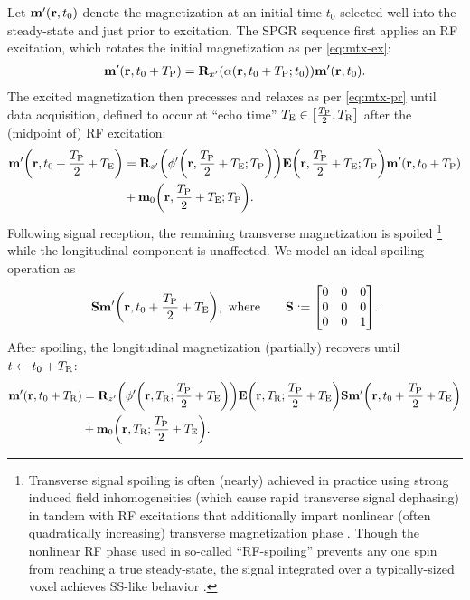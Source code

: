 Let $\bmmp\prtz$ denote the magnetization
at an initial time $t_0$ 
selected well into the steady-state
and just prior to excitation.
The SPGR sequence first applies
an RF excitation, 
which rotates the initial magnetization
as per \eqref{eq:mtx-ex}:
\begin{align}
	\bmmp\paren{\bmr,t_0+\TP} = \bmRxp{\flip\prtzt{t_0+\TP}} \bmmp\prtz.
	\label{eq:spgr-ex}
\end{align}
The excited magnetization 
then precesses and relaxes
as per \eqref{eq:mtx-pr}
until data acquisition,
defined to occur at
``echo time'' $\TE \in \brac{\frac{\TP}{2},\TR}$
after the (midpoint of) RF excitation:
\begin{align}
	\bmmp\paren{\bmr,t_0+\frac{\TP}{2}+\TE} &=
	\bmRzp{\php\paren{\bmr,\frac{\TP}{2}+\TE;\TP}} 
	\bmE\paren{\bmr,\frac{\TP}{2}+\TE;\TP} \bmmp\paren{\bmr,t_0+\TP} \nonumber \\
	&+ \bmmzero\paren{\bmr,\frac{\TP}{2}+\TE;\TP}.
	\label{eq:spgr-daq}
\end{align}
Following signal reception,
the remaining transverse magnetization 
is spoiled 
\footnote{Transverse signal spoiling 
is often (nearly) achieved in practice
using strong induced field inhomogeneities 
(which cause rapid transverse signal dephasing)
in tandem with RF excitations
that additionally impart nonlinear
(often quadratically increasing)
transverse magnetization phase
\cite{zur:91:sot}.
Though the nonlinear RF phase
used in so-called ``RF-spoiling'' 
prevents any one spin
from reaching a true steady-state,
the signal integrated
over a typically-sized voxel
achieves SS-like behavior
\cite{denolin:05:nii}.
}
while the longitudinal component
is unaffected. 
We model an ideal spoiling operation as
\begin{align}
	\bmS \bmmp\paren{\bmr,t_0+\frac{\TP}{2}+\TE}, \where \qquad
	\bmS := 
	\begin{bmatrix}
		0 & 0 & 0 \\
		0 & 0 & 0 \\
		0 & 0 & 1
	\end{bmatrix}.
	\label{eq:spgr-spoil}
\end{align}
After spoiling, 
the longitudinal magnetization 
(partially) recovers
until $t \gets t_0+T_\mathrm{R}$:
\begin{align}
	\bmmp\paren{\bmr,t_0+\TR} &= 
	\bmRzp{\php\paren{\bmr,\TR;\frac{\TP}{2}+\TE}} 
	\bmE\paren{\bmr,\TR;\frac{\TP}{2}+\TE} \bmS 
	\bmmp\paren{\bmr,t_0+\frac{\TP}{2}+\TE} \nonumber \\
	&+ \bmmzero\paren{\bmr,\TR;\frac{\TP}{2}+\TE}.
	\label{eq:spgr-pr}
\end{align}
